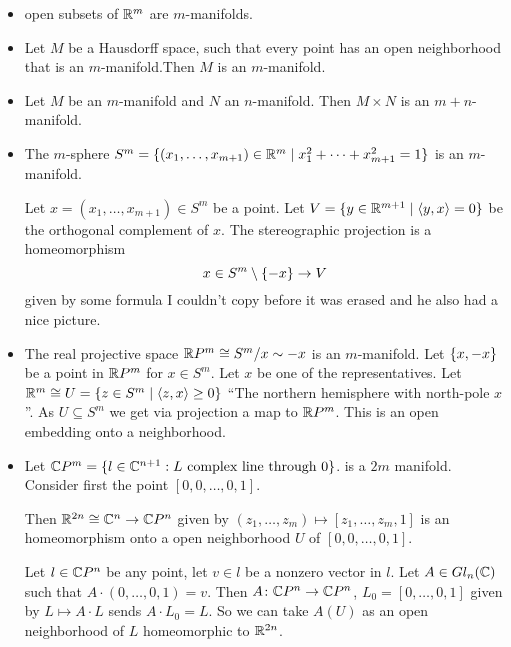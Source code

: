 \documentclass[language=english]{TemplateLecture}
\begin{document}
\begin{example}
    \begin{itemize}
        \item open subsets of \(\mathbb{R}^m\) are \(m\)-manifolds.
        \item Let \(M\) be a Hausdorff space, such that every point has an open neighborhood that is an \(m\)-manifold.Then \(M\) is an \(m\)-manifold.
        \item Let \(M\) be an \(m\)-manifold and \(N\) an \(n\)-manifold. Then \(M\times N\) is an \(m+n\)-manifold.
        \item The \(m\)-sphere \(S^m = \{(x_1, \dots, x_{m+1}) \in \mathbb{R}^m \mid x_1^2 + \dots + x_{m+1}^2 = 1\}\) is an \(m\)-manifold.
        
        Let \(x = (x_1, \dots, x_{m+1}) \in S^m\) be a point. Let \(V = \{y \in \mathbb{R}^{m+1} \mid \langle y,x\rangle = 0\}\) be the orthogonal complement of \(x\). The stereographic projection is a homeomorphism
        \[x \in S^m \setminus \{-x\} \to V\]
        given by some formula I couldn't copy before it was erased and he also had a nice picture.
        \item The real projective space \(\mathbb{R} P^m \cong S^m/x \sim -x\) is an \(m\)-manifold. Let \(\{x, -x\}\) be a point in \(\mathbb{R} P^m\) for \(x \in S^m\). Let \(x\) be one of the representatives. Let \(\mathbb{R}^m \cong U = \{z \in S^m \mid \langle z,x\rangle \geq 0\}\) \enquote{The northern hemisphere with north-pole \(x\)}. As \(U \subseteq S^m\) we get via projection a map to \(\mathbb{R} P^m\). This is an open embedding onto a neighborhood.
        
        \item Let \(\mathbb{C} P^m = \{l \in \mathbb{C}^{n+1} : L \text{ complex line through } 0\}\). is a \(2m\) manifold. Consider first the point \([0,0, \dots, 0, 1]\).
        
        Then \(\mathbb{R}^{2n} \cong \mathbb{C}^n \to \mathbb{C} P ^n\) given by \((z_1, \dots, z_m) \mapsto [z_1, \dots, z_m, 1]\) is an homeomorphism onto a open neighborhood \(U\) of \([0,0,\dots, 0, 1]\).

        Let \(l \in \mathbb{C} P^n\) be any point, let \(v \in l\) be a nonzero vector in \(l\). Let \(A \in Gl_n(\mathbb{C})\) such that \(A\cdot (0, \dots, 0,1) = v\).
        Then \(A \colon \mathbb{C} P^n \to \mathbb{C} P^n\), \(L_0 = [0, \dots, 0,1]\) given by \(L \mapsto A\cdot L\) sends \(A \cdot L_0 = L\). So we can take \(A(U)\) as an open neighborhood of \(L\) homeomorphic to \(\mathbb{R}^{2n}\).
    \end{itemize}
\end{example}
\end{document}
